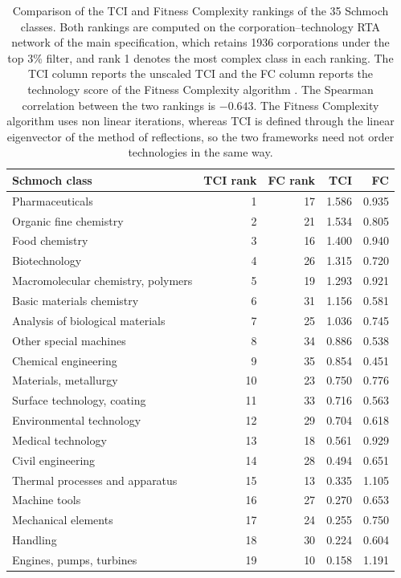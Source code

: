 \documentclass[lineno,pdflatex,sn-mathphys-num]{sn-jnl}%
\theoremstyle{thmstyleone}%
\theoremstyle{thmstyletwo}%
\theoremstyle{thmstylethree}%
\begin{document}
\begin{appendices}
\begin{table}[ht]
\caption{Comparison of the TCI and Fitness Complexity rankings of the 35 Schmoch classes.
Both rankings are computed on the corporation--technology RTA network of the main specification, which retains 1936 corporations under the top 3\% filter, and rank 1 denotes the most complex class in each ranking.
The TCI column reports the unscaled TCI and the FC column reports the technology score of the Fitness Complexity algorithm \cite{Tacchella2012}.
The Spearman correlation between the two rankings is $-0.643$.
The Fitness Complexity algorithm uses non linear iterations, whereas TCI is defined through the linear eigenvector of the method of reflections, so the two frameworks need not order technologies in the same way.}
\label{tab:fitness}
\begin{tabular}{lrrrr}
\toprule
Schmoch class & TCI rank & FC rank & TCI & FC \\
\midrule
Pharmaceuticals & 1 & 17 & 1.586 & 0.935 \\
Organic fine chemistry & 2 & 21 & 1.534 & 0.805 \\
Food chemistry & 3 & 16 & 1.400 & 0.940 \\
Biotechnology & 4 & 26 & 1.315 & 0.720 \\
Macromolecular chemistry, polymers & 5 & 19 & 1.293 & 0.921 \\
Basic materials chemistry & 6 & 31 & 1.156 & 0.581 \\
Analysis of biological materials & 7 & 25 & 1.036 & 0.745 \\
Other special machines & 8 & 34 & 0.886 & 0.538 \\
Chemical engineering & 9 & 35 & 0.854 & 0.451 \\
Materials, metallurgy & 10 & 23 & 0.750 & 0.776 \\
Surface technology, coating & 11 & 33 & 0.716 & 0.563 \\
Environmental technology & 12 & 29 & 0.704 & 0.618 \\
Medical technology & 13 & 18 & 0.561 & 0.929 \\
Civil engineering & 14 & 28 & 0.494 & 0.651 \\
Thermal processes and apparatus & 15 & 13 & 0.335 & 1.105 \\
Machine tools & 16 & 27 & 0.270 & 0.653 \\
Mechanical elements & 17 & 24 & 0.255 & 0.750 \\
Handling & 18 & 30 & 0.224 & 0.604 \\
Engines, pumps, turbines & 19 & 10 & 0.158 & 1.191 \\

\end{tabular}
\end{table}
\end{appendices}
\end{document}

